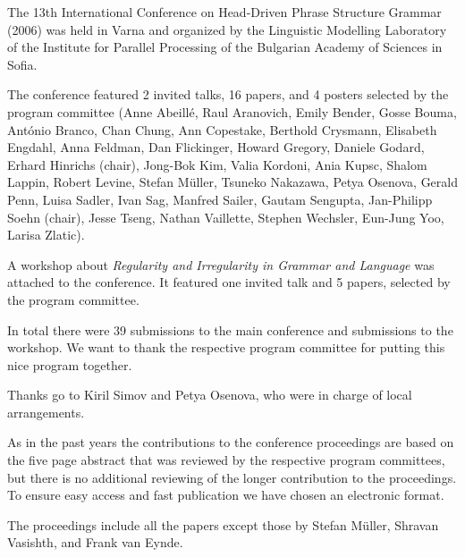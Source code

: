 The 13th International Conference on Head-Driven Phrase Structure Grammar (2006) was held in Varna
and organized by the Linguistic Modelling Laboratory of the Institute for Parallel Processing of the
Bulgarian Academy of Sciences in Sofia.

The conference featured 2 invited talks, 16 papers, and 4 posters
selected by the program committee 
(Anne Abeillé,
Raul Aranovich,
Emily Bender,
Gosse Bouma,
António Branco,
Chan Chung,
Ann Copestake,
Berthold Crysmann,
Elisabeth Engdahl,
Anna Feldman,
Dan Flickinger,
Howard Gregory,
Daniele Godard,
Erhard Hinrichs (chair),
Jong-Bok Kim,
Valia Kordoni,
Ania Kupsc,
Shalom Lappin,
Robert Levine,
Stefan Müller,
Tsuneko Nakazawa,
Petya Osenova,
Gerald Penn,
Luisa Sadler,
Ivan Sag,
Manfred Sailer,
Gautam Sengupta,
Jan-Philipp Soehn (chair),
Jesse Tseng,
Nathan Vaillette,
Stephen Wechsler,
Eun-Jung Yoo,
Larisa Zlatic).

A workshop about \emph{Regularity and Irregularity in Grammar and Language}
was attached to the conference. It featured one invited talk
and 5 papers, selected by the program committee.

In total there were 39 submissions to the main conference and  submissions to the
workshop. %
We want to thank the respective program committee for putting this nice program together.




Thanks go to Kiril Simov and Petya Osenova, who were in charge of local arrangements.


As in the past years the contributions to the conference proceedings are based on the five page abstract
that was reviewed by the respective program committees, but there is no additional reviewing of the
longer contribution to the proceedings.
To ensure easy access and fast publication we have chosen an electronic format.


The proceedings include all the papers except those by Stefan Müller, Shravan Vasishth, and Frank
van Eynde.
